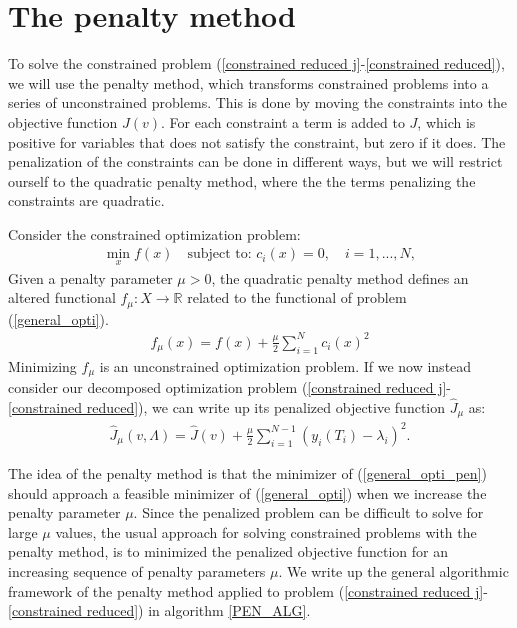 \section{The penalty method} \label{penalty_sec}
To solve the constrained problem (\ref{constrained reduced j}-\ref{constrained reduced}), we will use the penalty method\cite{nocedal2006numerical}, which transforms constrained problems into a series of unconstrained problems. This is done by moving the constraints into the objective function $J(v)$. For each constraint a term is added to $J$, which is positive for variables that does not satisfy the constraint, but zero if it does. The penalization of the constraints can be done in different ways, but we will restrict ourself to the quadratic penalty method, where the the terms penalizing the constraints are quadratic. 
\begin{definition}\label{QuadPenMethDef}
Consider the constrained optimization problem:
\begin{align}
\min_x f(x)\quad\textrm{subject to: } c_i(x)=0,\quad i=1,...,N, \label{general_opti}
\end{align}
Given a penalty parameter $\mu>0$, the quadratic penalty method defines an altered functional $f_{\mu}:X\rightarrow\mathbb{R}$ related to the functional of problem (\ref{general_opti}).
\begin{align}
f_{\mu}(x) = f(x) +\frac{\mu }{2}\sum_{i=1}^Nc_i(x)^2 \label{general_opti_pen}
\end{align}
Minimizing $f_{\mu}$ is an unconstrained optimization problem. If we now instead consider our decomposed optimization problem (\ref{constrained reduced j}-\ref{constrained reduced}), we can write up its penalized objective function $\hat J_{\mu}$ as:
\begin{align}
\hat J_{\mu}(v,\Lambda) = \hat J(v) + \frac{\mu}{2}\sum_{i=1}^{N-1}(y_{i}(T_i)-\lambda_i)^2. \label{pen_obj_J}
\end{align}
\end{definition}
\noindent
The idea of the penalty method is that the minimizer of (\ref{general_opti_pen}) should approach a feasible minimizer of (\ref{general_opti}) when we increase the penalty parameter $\mu$. Since the penalized problem can be difficult to solve for large $\mu$ values, the usual approach for solving constrained problems with the penalty method, is to minimized the penalized objective function for an increasing sequence of penalty parameters $\mu$. We write up the general algorithmic framework of the penalty method applied to problem (\ref{constrained reduced j}-\ref{constrained reduced}) in algorithm \ref{PEN_ALG}. 
